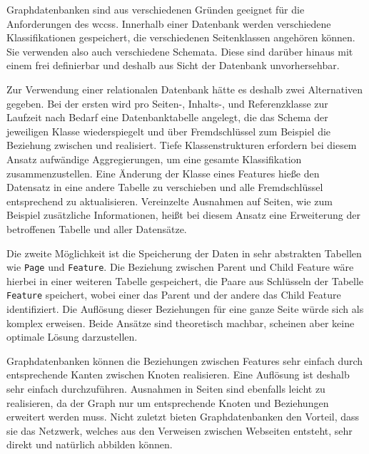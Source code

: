     Graphdatenbanken sind aus verschiedenen Gründen geeignet für die Anforderungen des \glspl{wccs}.
    Innerhalb einer Datenbank werden verschiedene Klassifikationen gespeichert,
    die verschiedenen Seitenklassen angehören können.
    Sie verwenden also auch verschiedene Schemata.
    Diese sind darüber hinaus mit einem {\classificationModel} frei definierbar und deshalb aus Sicht der Datenbank unvorhersehbar.
    
    Zur Verwendung einer relationalen Datenbank hätte es deshalb zwei Alternativen gegeben.
    Bei der ersten wird pro Seiten-, Inhalts-, und Referenzklasse zur Laufzeit nach Bedarf eine Datenbanktabelle angelegt,
    die das Schema der jeweiligen Klasse wiederspiegelt und über Fremdschlüssel zum Beispiel die Beziehung
    zwischen {\parentFeature} und {\childFeature} realisiert.
    Tiefe Klassenstrukturen erfordern bei diesem Ansatz aufwändige Aggregierungen,
    um eine gesamte Klassifikation zusammenzustellen.
    Eine Änderung der Klasse eines Features hieße den Datensatz in eine andere Tabelle zu verschieben
    und alle Fremdschlüssel entsprechend zu aktualisieren.
    Vereinzelte Ausnahmen auf Seiten, wie zum Beispiel zusätzliche Informationen, heißt bei diesem Ansatz
    eine Erweiterung der betroffenen Tabelle und aller Datensätze.

    Die zweite Möglichkeit ist die Speicherung der Daten in sehr abstrakten Tabellen
    wie \texttt{Page} und \texttt{Feature}.
    Die Beziehung zwischen Parent und Child Feature wäre hierbei in einer weiteren Tabelle gespeichert,
    die Paare aus Schlüsseln der Tabelle \texttt{Feature} speichert, wobei einer das Parent und der andere das
    Child Feature identifiziert.
    Die Auflösung dieser Beziehungen für eine ganze Seite würde sich als komplex erweisen.
    Beide Ansätze sind theoretisch machbar, scheinen aber keine optimale Lösung darzustellen.

    Graphdatenbanken können die Beziehungen zwischen Features sehr einfach durch entsprechende Kanten zwischen Knoten realisieren.
    Eine Auflösung ist deshalb sehr einfach durchzuführen.
    Ausnahmen in Seiten sind ebenfalls leicht zu realisieren,
    da der Graph nur um entsprechende Knoten und Beziehungen erweitert werden muss.
    Nicht zuletzt bieten Graphdatenbanken den Vorteil,
    dass sie das Netzwerk, welches aus den Verweisen zwischen
    Webseiten entsteht, sehr direkt und natürlich abbilden können.
